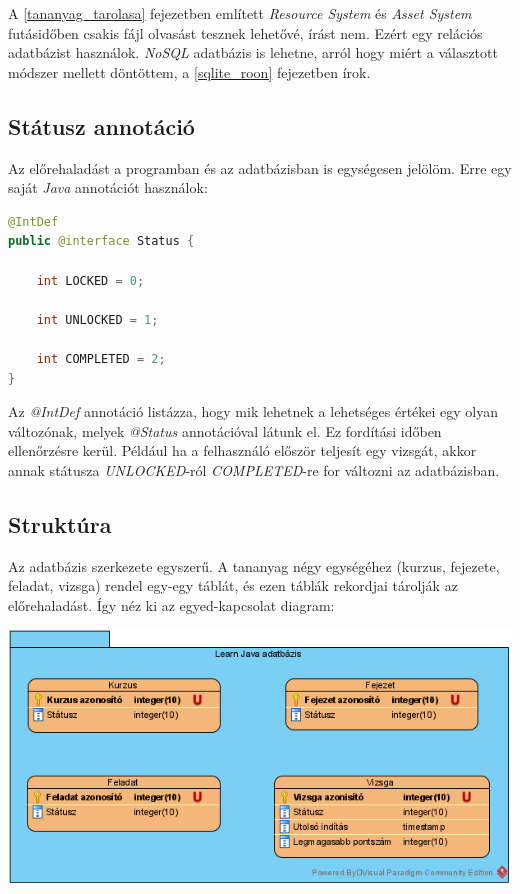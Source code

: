 \documentclass[12pt,a4paper]{article}
\begin{document}
	A \ref{tananyag_tarolasa} fejezetben említett \textit{Resource System} és \textit{Asset System} futásidőben csakis fájl olvasást tesznek lehetővé, írást nem. Ezért egy relációs adatbázist használok. \textit{NoSQL} adatbázis is lehetne, arról hogy miért a választott módszer mellett döntöttem, a \ref{sqlite_roon} fejezetben írok.
	 
	\subsection{Státusz annotáció}\label{statusz}
	
	Az előrehaladást a programban és az adatbázisban is egységesen jelölöm. Erre egy saját \textit{Java} annotációt használok:
	
	\begin{lstlisting}[language=Java]
@IntDef
public @interface Status {

	int LOCKED = 0;
		
	int UNLOCKED = 1;
		
	int COMPLETED = 2;
}
	\end{lstlisting}
	
	Az \textit{@IntDef} annotáció listázza, hogy mik lehetnek a lehetséges értékei egy olyan változónak, melyek \textit{@Status} annotációval látunk el. Ez fordítási időben ellenőrzésre kerül. Például ha a felhasználó először teljesít egy vizsgát, akkor annak státusza \textit{UNLOCKED}-ról \textit{COMPLETED}-re for változni az adatbázisban.
	 
	\subsection{Struktúra}
	 
	Az adatbázis szerkezete egyszerű. A tananyag négy egységéhez (kurzus, fejezete, feladat, vizsga) rendel egy-egy táblát, és ezen táblák rekordjai tárolják az előrehaladást. Így néz ki az egyed-kapcsolat diagram:
	
	\begin{center}
		\includegraphics[width=\linewidth]{db_model}
	\end{center}
	
\end{document}
